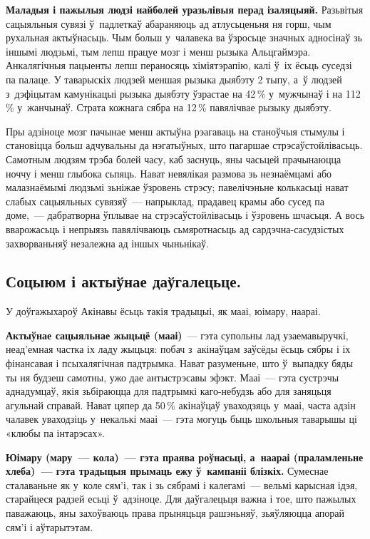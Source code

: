 \textbf{Маладыя і пажылыя людзі найболей уразьлівыя перад ізаляцыяй.} Разьвітыя сацыяльныя сувязі ў~падлеткаў абараняюць ад атлусьценьня ня горш, чым рухальная актыўнасьць. Чым больш у~чалавека ва ўзросьце значных адносінаў зь іншымі людзьмі, тым лепш працуе мозг і менш рызыка Альцгаймэра. Анкалягічныя пацыенты лепш пераносяць хіміятэрапію, калі ў~іх ёсьць суседзі па палаце. У таварыскіх людзей меншая рызыка дыябэту 2 тыпу, а~ў людзей з~дэфіцытам камунікацыі рызыка дыябэту ўзрастае на 42\,\% у~мужчынаў і на 112\,\% у~жанчынаў. Страта кожнага сябра на 12\,\% павялічвае рызыку дыябэту.


Пры адзіноце мозг пачынае менш актыўна рэагаваць на станоўчыя стымулы і становіцца больш адчувальны да нэгатыўных, што пагаршае стрэсаўстойлівасьць. Самотным людзям трэба болей часу, каб заснуць, яны часьцей прачынаюцца ноччу і менш глыбока сьпяць. Нават невялікая размова зь незнаёмцамі або малазнаёмымі людзьмі зьніжае ўзровень стрэсу; павелічэньне колькасьці нават слабых сацыяльных сувязяў~--- напрыклад, прадавец крамы або сусед па доме,~--- дабратворна ўплывае на стрэсаўстойлівасьць і ўзровень шчасьця. А вось вварожасьць і непрыязь павялічваюць сьмяротнасьць ад сардэчна-сасудзістых захворваньняў незалежна ад іншых чыньнікаў. 

\subsection*{Соцыюм і актыўнае даўгалецьце.}

У доўгажыхароў Акінавы ёсьць такія традыцыі, як мааі, юімару, наараі.

\textbf{Актыўнае сацыяльнае жыцьцё (мааі)}~--- гэта супольны лад узаемавыручкі, неад'емная частка іх ладу жыцьця: побач з~акінаўцам заўсёды ёсьць сябры і іх фінансавая і псыхалягічная падтрымка. Нават разуменьне, што ў~выпадку бяды ты ня будзеш самотны, ужо дае антыстрэсавы эфэкт. Мааі~--- гэта сустрэчы аднадумцаў, якія зьбіраюцца для падтрымкі каго-небудзь або для заняцьця агульнай справай. Нават цяпер да 50\,\% акінаўцаў уваходзяць у~мааі, часта адзін чалавек уваходзіць у~некалькі мааі~--- гэта могуць быць школьныя таварышы ці «клюбы па інтарэсах».

\textbf{Юімару (мару~--- кола)~--- гэта праява роўнасьці, а~наараі (праламленьне хлеба)~--- гэта традыцыя прымаць ежу ў~кампаніі блізкіх.} Сумеснае сталаваньне як у~коле сям'і, так і зь сябрамі і калегамі~--- вельмі карысная ідэя, старайцеся радзей есьці ў~адзіноце. Для даўгалецьця важна і тое, што пажылых паважаюць, яны захоўваюць права прыняцьця рашэньняў, зьяўляюцца апорай сям'і і аўтарытэтам.

